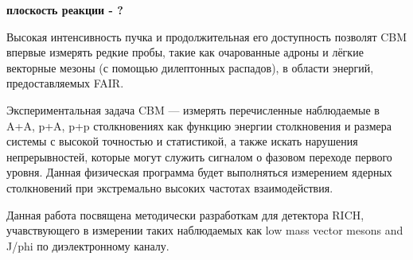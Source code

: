 \todo \textbf{плоскость реакции - ?}

Высокая интенсивность пучка и продолжительная его доступность позволят CBM впервые измерять редкие пробы, такие как очарованные адроны и лёгкие векторные мезоны (с помощью дилептонных распадов), в области энергий, предоставляемых FAIR.

Экспериментальная задача CBM --- измерять перечисленные наблюдаемые в A+A, p+A, p+p столкновениях как функцию энергии столкновения и размера системы с высокой точностью и статистикой, а также искать нарушения непрерывностей, которые могут служить сигналом о фазовом переходе первого уровня. Данная физическая программа будет выполняться измерением ядерных столкновений при экстремально высоких частотах взаимодействия.

Данная работа посвящена методически разработкам для детектора RICH, учавствующего в измерении таких наблюдаемых как low mass vector mesons and J/phi по диэлектронному каналу.









